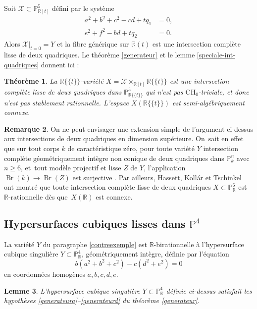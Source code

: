 \documentclass[JEP,XML,SOM,Unicode,francais,published]{cedram}
\newcommand{\CH}{\mathrm{CH}}
\newtheorem{thm}{Théorème}[section]
\newtheorem{lemma}[thm]{Lemme}
\theoremstyle{definition}
\newtheorem{rmk}[thm]{Remarque}
\newcommand{\R}{\mathbb R}
\renewcommand{\P}{\mathbb P}
\newcommand{\Br}{\operatorname{Br}}
\newcommand{\mc}[1]{\mathcal{#1}}
\newcommand{\puiseux}{\mathbb{R}\{\!\{t\}\!\}}
\begin{document}
Soit $\mc{X}\subset \P^5_{\R[t]}$ défini par le système
\begin{align*}
a^2+ b^2+c^2 - cd +tq_1 &=0,\\
e^2+f^2 -bd +t q_2 &=0.
\end{align*}
Alors $\mc{X}|_{t=0}=Y$ et la fibre générique sur $\R(t)$ est une intersection complète lisse de deux quadriques. Le théorème \ref{generateur} et le lemme \ref{speciale-int-quadriques} donnent ici :

\begin{thm}\label{prop-intersection-quadriques}
La $\puiseux$-variété $X= \mc{X}\times_{\R[t]} \puiseux$ est une intersection complète lisse de deux quadriques dans $\P^5_{\puiseux}$ qui n'est pas $\CH_0$-triviale, et donc n'est pas
stablement rationnelle. L'espace $X(\puiseux)$ est semi-algébriquement connexe.\end{thm}

\begin{rmk}
On ne peut envisager une extension simple de l'argument ci-dessus aux intersections de deux quadriques en dimension supérieure. On~sait en effet
que sur tout corps $k$ de caractéristique zéro, pour toute variété $Y$ intersection complète géométriquement intègre non conique de deux quadriques dans $\P^n_k$ avec $n\geq 6$, et~tout modèle projectif et lisse $Z$ de $Y$, l'application
$\Br(k) \to \Br(Z)$ est surjective \cite[Th.\,3.8]{colliot1987intersectionsI}.
Par ailleurs, Hassett, Kollár et Tschinkel
\cite{hassett2022rationality} ont montré que toute intersection complète lisse de deux quadriques $X \subset \P^6_{\R} $
est $\R$-rationnelle dès que~$X(\R)$ est connexe.
\end{rmk}

\subsection{Hypersurfaces cubiques lisses dans \texorpdfstring{$\P^4$}{P4} }\label{exemplecubique}

La variété $Y$ du paragraphe \ref{contreexemple} est $\R$-birationnelle à l'hypersurface cubique singulière $Y \subset \P^4_{\R}$, géométriquement intègre, définie
par l'équation
\begin{equation}\label{Ycub}
b(a^2+b^2+c^2) - c(d^2+e^2)=0
\end{equation}
en coordonnées homogènes $a,b,c,d,e$.

\begin{lemma}\label{cubique}
L'hypersurface cubique singulière $Y \subset \P^4_{\R}$ définie ci-dessus satisfait les hypothèses \eqref{generateura}--\eqref{generateurd} du théorème \ref{generateur}.
\end{lemma}
\end{document}

